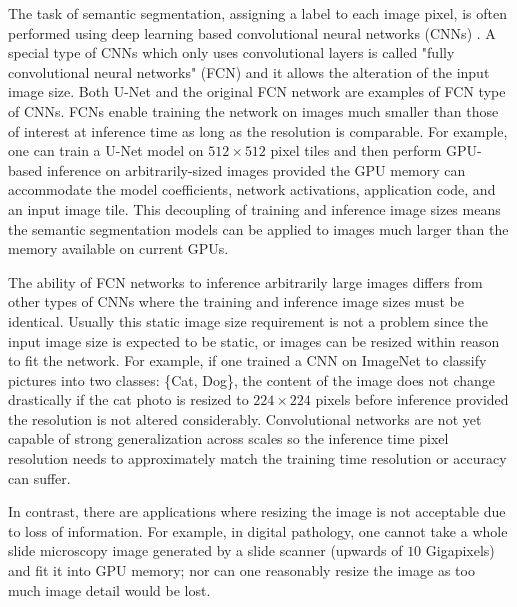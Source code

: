 \documentclass[runningheads]{llncs}
\begin{document}
The task of semantic segmentation, assigning a label to each image pixel, is often performed using deep learning based convolutional neural networks (CNNs) \cite{Badrinarayanan2015a,Ronneberger2015a}. A special type of CNNs which only uses convolutional layers is called "fully convolutional neural networks" (FCN) and it allows the alteration of the input image size. 
Both U-Net \cite{Ronneberger2015a} and the original FCN network \cite{Long2015} are examples of FCN type of CNNs. 
FCNs enable training the network on images much smaller than those of interest at inference time as long as the resolution is comparable. 
For example, one can train a U-Net model on $512 \times 512$ pixel tiles and then perform GPU-based inference on arbitrarily-sized images provided the GPU memory can accommodate the model coefficients, network activations, application code, and an input image tile. This decoupling of training and inference image sizes means the semantic segmentation models can be applied to images much larger than the memory available on current GPUs. 

The ability of FCN networks to inference arbitrarily large images differs from other types of CNNs where the training and inference image sizes must be identical. Usually this static image size requirement is not a problem since the input image size is expected to be static, or images can be resized within reason to fit the network. For example, if one trained a CNN on ImageNet \cite{Russakovsky2015} to classify pictures into two classes: \{Cat, Dog\}, the content of the image does not change drastically if the cat photo is resized to $224 \times 224$ pixels before inference provided the resolution is not altered considerably. Convolutional networks are not yet capable of strong generalization across scales \cite{Jaderberg2015,Lin2017a} so the inference time pixel resolution needs to approximately match the training time resolution or accuracy can suffer.

In contrast, there are applications where resizing the image is not acceptable due to loss of information. For example, in digital pathology, one cannot take a whole slide microscopy image generated by a slide scanner (upwards of $\num{10}$ Gigapixels) and fit it into GPU memory; nor can one reasonably resize the image as too much image detail would be lost. 
\end{document}
